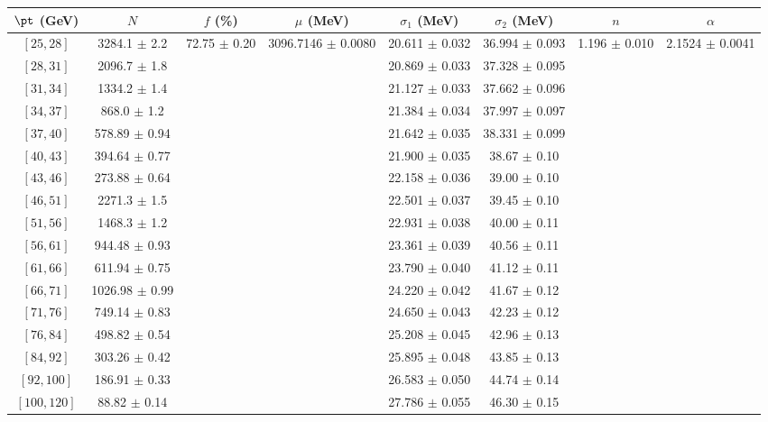 \begin{tabular}{c||c|c|c|c|c|c|c}
$\pt$ (GeV) & $N$ & $f$ (\%) & $\mu$ (MeV) & $\sigma_1$ (MeV) & $\sigma_2$ (MeV) & $n$ & $\alpha$ \\
\hline
$[25, 28]$ & 3284.1 $\pm$ 2.2 & \multirow{17}{*}{72.75 $\pm$ 0.20} & \multirow{17}{*}{3096.7146 $\pm$ 0.0080} & 20.611 $\pm$ 0.032 & 36.994 $\pm$ 0.093 & \multirow{17}{*}{1.196 $\pm$ 0.010} & \multirow{17}{*}{2.1524 $\pm$ 0.0041}\\
$[28, 31]$ & 2096.7 $\pm$ 1.8 &  &  & 20.869 $\pm$ 0.033 & 37.328 $\pm$ 0.095 &  & \\
$[31, 34]$ & 1334.2 $\pm$ 1.4 &  &  & 21.127 $\pm$ 0.033 & 37.662 $\pm$ 0.096 &  & \\
$[34, 37]$ & 868.0 $\pm$ 1.2 &  &  & 21.384 $\pm$ 0.034 & 37.997 $\pm$ 0.097 &  & \\
$[37, 40]$ & 578.89 $\pm$ 0.94 &  &  & 21.642 $\pm$ 0.035 & 38.331 $\pm$ 0.099 &  & \\
$[40, 43]$ & 394.64 $\pm$ 0.77 &  &  & 21.900 $\pm$ 0.035 & 38.67 $\pm$ 0.10 &  & \\
$[43, 46]$ & 273.88 $\pm$ 0.64 &  &  & 22.158 $\pm$ 0.036 & 39.00 $\pm$ 0.10 &  & \\
$[46, 51]$ & 2271.3 $\pm$ 1.5 &  &  & 22.501 $\pm$ 0.037 & 39.45 $\pm$ 0.10 &  & \\
$[51, 56]$ & 1468.3 $\pm$ 1.2 &  &  & 22.931 $\pm$ 0.038 & 40.00 $\pm$ 0.11 &  & \\
$[56, 61]$ & 944.48 $\pm$ 0.93 &  &  & 23.361 $\pm$ 0.039 & 40.56 $\pm$ 0.11 &  & \\
$[61, 66]$ & 611.94 $\pm$ 0.75 &  &  & 23.790 $\pm$ 0.040 & 41.12 $\pm$ 0.11 &  & \\
$[66, 71]$ & 1026.98 $\pm$ 0.99 &  &  & 24.220 $\pm$ 0.042 & 41.67 $\pm$ 0.12 &  & \\
$[71, 76]$ & 749.14 $\pm$ 0.83 &  &  & 24.650 $\pm$ 0.043 & 42.23 $\pm$ 0.12 &  & \\
$[76, 84]$ & 498.82 $\pm$ 0.54 &  &  & 25.208 $\pm$ 0.045 & 42.96 $\pm$ 0.13 &  & \\
$[84, 92]$ & 303.26 $\pm$ 0.42 &  &  & 25.895 $\pm$ 0.048 & 43.85 $\pm$ 0.13 &  & \\
$[92, 100]$ & 186.91 $\pm$ 0.33 &  &  & 26.583 $\pm$ 0.050 & 44.74 $\pm$ 0.14 &  & \\
$[100, 120]$ & 88.82 $\pm$ 0.14 &  &  & 27.786 $\pm$ 0.055 & 46.30 $\pm$ 0.15 &  & \\
\end{tabular}
